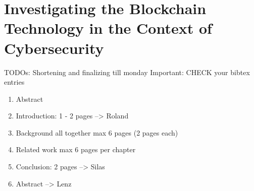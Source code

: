 \chapter{Investigating the Blockchain Technology
in the Context of Cybersecurity}




TODOs:
Shortening and finalizing till monday
Important: CHECK your bibtex entries
\begin{enumerate}
	\item Abstract
	\item Introduction: 1 - 2 pages --> Roland
	\item Background all together max 6 pages (2 pages each)
	\item Related work max 6 pages per chapter
	\item Conclusion: 2 pages --> Silas
	\item Abstract --> Lenz
\end{enumerate}


\newpage

\minitoc %

\newpage


\newpage


\newpage


\newpage



\nocite{*}


